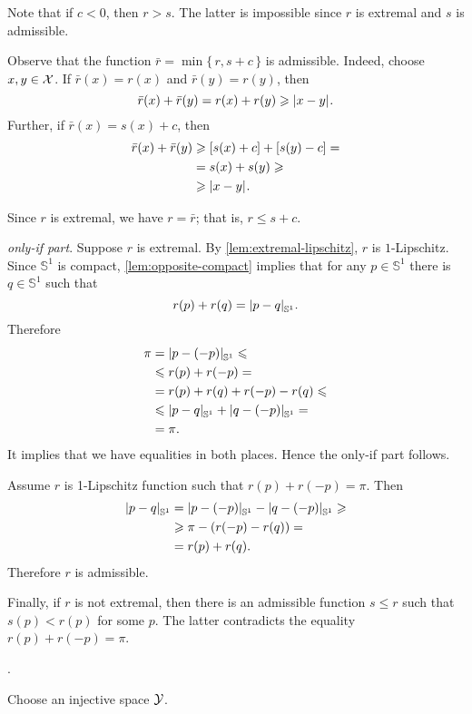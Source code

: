 Note that if $c<0$, then $r>s$.
The latter is impossible since $r$ is extremal and $s$ is admissible.

Observe that the function $\bar r=\min\{\,r,s+c\,\}$ is admissible.
Indeed, choose $x,y\in \mathcal{X}$.
If $\bar r(x)=r(x)$ and $\bar r(y)=r(y)$, then 
\[\bar r(x)+\bar r(y)=r(x)+ r(y)\ge \dist{x}{y}{}.\]
Further, if $\bar r(x)=s(x)+c$, then 
\begin{align*}
\bar r(x)+\bar r(y)&\ge [s(x)+c]+ [s(y)-c]= 
\\
&=s(x)+s(y) \ge 
\\
&\ge\dist{x}{y}{}.
\end{align*}

Since $r$ is extremal, we have $r=\bar r$;
that is, $r\le s+c$.

\parbf{\ref{ex:circle};} \textit{only-if part}.
Suppose $r$ is extremal.
By \ref{lem:extremal-lipschitz}, $r$ is $1$-Lipschitz.
Since $\mathbb{S}^1$ is compact, \ref{lem:opposite-compact} implies that for any $p\in \mathbb{S}^1$ there is $q\in \mathbb{S}^1$ such that 
\[r(p)+r (q) = \dist{p}{q}{\mathbb{S}^1}.\]
Therefore
\begin{align*}
\pi&=\dist{p}{(-p)}{\mathbb{S}^1}\le 
\\
&\le 
r(p)+r(-p)=
\\
&=
r(p)+r(q) +r(-p) -r(q)\le
\\
&\le
\dist{p}{q}{\mathbb{S}^1}+\dist{q}{(-p)}{\mathbb{S}^1}=
\\
&=\pi.
\end{align*}
It implies that we have equalities in both places.
Hence the only-if part follows.

Assume $r$ is 1-Lipschitz function such that $r(p)+r(-p)=\pi$.
Then 
\begin{align*}
\dist pq{\mathbb{S}^1}&=
\dist{p}{(-p)}{\mathbb{S}^1}-\dist{q}{(-p)}{\mathbb{S}^1}\ge
\\
&\ge\pi -(r(-p)-r(q))=
\\
&=r(p)+r(q).
\end{align*}
Therefore $r$ is admissible.

Finally, if $r$ is not extremal, then there is an admissible function $s\le r$ such that $s(p)<r(p)$ for some $p$.
The latter contradicts the equality $r(p)+r(-p)=\pi$.

 \cite[Proposition 2.7]{zuest}.

Choose an injective space $\mathcal{Y}$.

